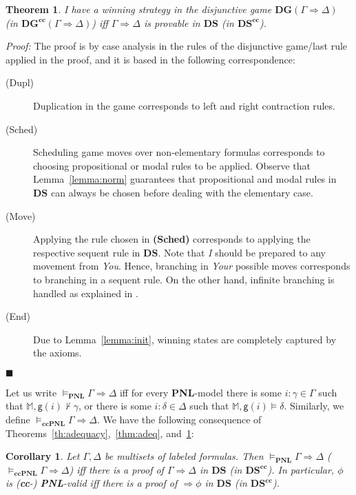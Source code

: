 \documentclass{easychair}
\newcommand{\I}{\emph{I}\xspace}
\newcommand{\You}{\emph{You}\xspace}
\newcommand{\Your}{\emph{Your}\xspace}
\newcommand{\DS}{\mathbf{DS}}
\newcommand{\seq}{\Rightarrow}
\newcommand{\M}{\mathbb{M}}
\newcommand{\g}{\mathsf{g}}
\renewcommand{\qed}{\hfill$\blacksquare$}
\newtheorem{theorem}{Theorem}
\newtheorem{corollary}{Corollary}
\renewenvironment{proof}{\noindent\textit{Proof:}\quad}{\qed}
\newcommand{\PNL}{\textbf{PNL}}
\newcommand{\cc}{\textbf{cc}}
\begin{document}
\begin{theorem}\label{thm:adequacy-sequent}
\I have a winning strategy in the disjunctive game $\mathbf{DG}(\Gamma\seq\Delta)$ (in $\mathbf{DG}^\cc(\Gamma \Rightarrow \Delta)$) iff $\Gamma\seq\Delta$ is provable in $\DS$ (in $\DS^\cc$). 
\end{theorem}
\begin{proof} The proof is by case analysis in the rules of the disjunctive game/last rule applied in the proof, and it is based in the following correspondence: 
\begin{description}
\item[(Dupl)] Duplication in the game corresponds to left and right contraction rules.
\item[(Sched)] Scheduling game moves over non-elementary formulas corresponds to choosing propositional or modal rules to be applied.
Observe that Lemma~\ref{lemma:norm} guarantees that propositional and modal rules in $\DS$ can always be chosen before dealing with the elementary case.
\item[(Move)] Applying the rule chosen in {\bf (Sched)} corresponds to applying the respective sequent rule in $\DS$.  Note that \I should be prepared to any movement from \You. Hence, branching in  \Your possible moves corresponds to branching in a sequent rule. On the other hand, infinite branching is handled as 
    explained in .
\item[(End)] Due to Lemma~\ref{lemma:init}, winning states are completely captured by the axioms.
\end{description}
\end{proof}

Let us write $\models_\PNL \Gamma \Rightarrow \Delta$ iff for every \PNL-model there is some $i:\gamma \in \Gamma$ such that $\M,\g(i)\not\vdash \gamma$, or there is some $i:\delta \in \Delta$ such that $\M,\g(i)\models \delta$. Similarly, we define $\models_{\cc\PNL} \Gamma \Rightarrow \Delta$. We have the following consequence of Theorems~\ref{th:adequacy},~\ref{thm:adeq}, and~\ref{thm:adequacy-sequent}: 

\begin{corollary}
Let $\Gamma,\Delta$ be multisets of labeled formulas. Then $\models_\PNL\Gamma \Rightarrow \Delta$ ($\models_{\cc\PNL} \Gamma \Rightarrow \Delta$) iff there is a proof of $\Gamma \Rightarrow \Delta$ in $\DS$ (in $\DS^\cc$). In particular, $\phi$ is (\cc-) \PNL-valid iff there is a proof of $\Rightarrow \phi$ in $\DS$ (in $\DS^\cc$).
\end{corollary}
\end{document}
